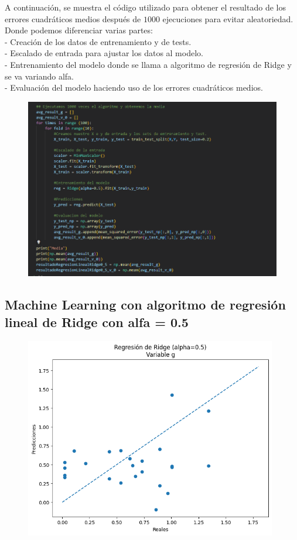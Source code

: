 \documentclass[oneside,openright,titlepage,numbers=noenddot,openany,headinclude,footinclude=true,
cleardoublepage=empty,abstractoff,BCOR=5mm,paper=a4,fontsize=12pt,main=spanish]{scrreprt}
\begin{document}
A continuación, se muestra el código utilizado para obtener el resultado de los errores cuadráticos medios después de $1000$ ejecuciones para evitar aleatoriedad. Donde podemos diferenciar varias partes:\\
- Creación de los datos de entrenamiento y de tests.\\
- Escalado de entrada para ajustar los datos al modelo.\\
- Entrenamiento del modelo donde se llama a algoritmo de regresión de Ridge y se va variando alfa.\\
- Evaluación del modelo haciendo uso de los errores cuadráticos medios.

\begin{figure}[H]
	\centering
	\includegraphics[width=15cm]{Código algoritmo de Ridge.png}
\end{figure}

\subsection{Machine Learning con algoritmo de regresión lineal de Ridge con alfa = 0.5}

\begin{figure}[H]
	\centering
	\includegraphics[width=11cm]{Regresión de Ridge (alpha=0.5) Variable g.png}
\end{figure}
\end{document}
